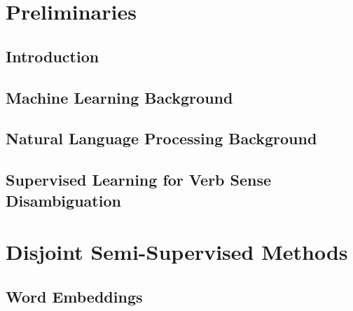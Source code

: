 \documentclass[
11pt, %
english, %
onehalfspacing, %
nolistspacing, %
headsepline, %
consistentlayout, %
]{MastersDoctoralThesis} %
\begin{document}



\mainmatter %

\pagestyle{thesis} %

\part{Preliminaries} 

\chapter{Introduction}\label{chapter:introduction}


\chapter{Machine Learning Background}\label{chapter:general_background}


\chapter{Natural Language Processing
Background}\label{chapter:domain_background}


\chapter{Supervised Learning for Verb Sense
Disambiguation}\label{chapter:supervised}


\part{Disjoint Semi-Supervised Methods} 

\chapter{Word Embeddings}\label{chapter:embeddings}

\end{document}
